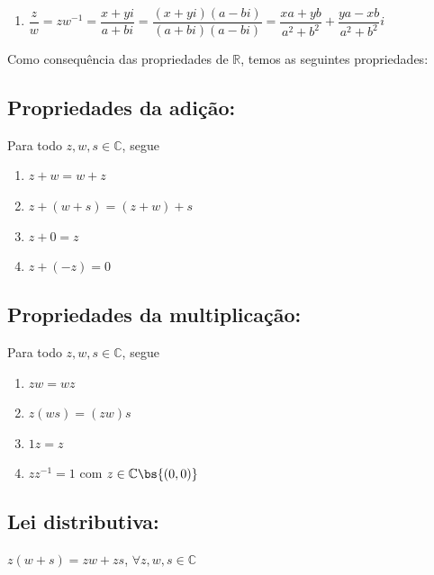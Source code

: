 \documentclass[12pt, oneside, a4paper, english, brazil]{abntex2}
\newcommand{\C}{\mathbb{C}}
\theoremstyle{normal}
\theoremstyle{observacao}
\begin{document}
\begin{enumerate}
\begin{proof}
Assim
\[
z' \equiv z^{-1} = \frac{a}{a^2+b^2} + i \frac{-b}{a^2+b^2}
\]
\end{proof}

\item $\dfrac{z}{w} = zw^{-1} = \dfrac{x+yi}{a+bi} = \dfrac{(x+yi)(a-bi)}{(a+bi)(a-bi)} = \dfrac{xa+yb}{a^2+b^2}+\dfrac{ya-xb}{a^2+b^2}i$
\end{enumerate}

Como consequência das propriedades de $\mathbb{R}$, temos as seguintes propriedades:

\subsection*{Propriedades da adição:}
Para todo $z, w, s \in \C$, segue
\begin{enumerate}[({A}1)]
\item $z+w = w+z$
\item $z+(w+s)=(z+w)+s$
\item $z+0=z$
\item $z+(-z) = 0$
\end{enumerate}

\subsection*{Propriedades da multiplicação:}
Para todo $z, w, s \in \C$, segue
\begin{enumerate}[({M}1)]
\item $zw=wz$
\item $z(ws)=(zw)s$
\item $1z=z$
\item $zz^{-1} = 1$ com $z \in \C\bs\{(0,0)\}$
\end{enumerate}

\subsection*{Lei distributiva:}
\noindent $z(w+s)=zw+zs$, $\forall z, w, s \in \C$
\end{document}
